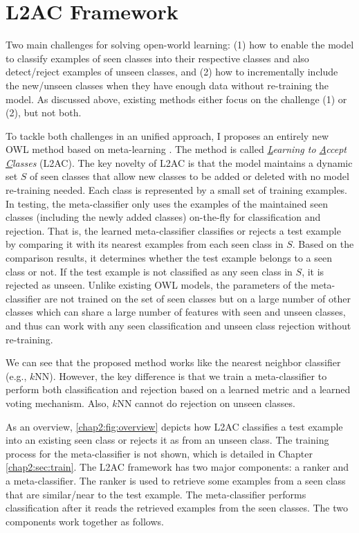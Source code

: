 \section{L2AC Framework}
Two main challenges for solving open-world learning: (1) how to enable the model to classify examples of seen classes into their respective classes and also detect/reject examples of unseen classes, and (2) how to incrementally include the new/unseen classes when they have enough data without re-training the model.
As discussed above, existing methods either focus on the challenge (1) or (2), but not both.

To tackle both challenges in an unified approach, I proposes an entirely new OWL method based on meta-learning \cite{thrun2012learning,andrychowicz2016learning,fernando2017pathnet,finn2017model,finn2018probabilistic}. The method is called \textit{\underline{L}earning to \underline{A}ccept \underline{C}lasses} (L2AC). The key novelty of L2AC is that the model maintains a dynamic set $S$ of seen classes that allow new classes to be added or deleted with no model re-training needed. Each class is represented by a small set of training examples. In testing, the meta-classifier only uses the examples of the maintained seen classes (including the newly added classes) on-the-fly for classification and rejection. That is, the learned meta-classifier classifies or rejects a test example by comparing it with its nearest examples from each seen class in $S$. Based on the comparison results, it determines whether the test example belongs to a seen class or not. If the test example is not classified as any seen class in $S$, it is rejected as unseen. Unlike existing OWL models, 
the parameters of the meta-classifier are not trained on the set of seen classes but on a large number of other classes which can share a large number of features with seen and unseen classes, and thus can work with any seen classification and unseen class rejection without re-training. 

We can see that the proposed method works like the nearest neighbor classifier (e.g., $k$NN). However, the key difference is that we train a meta-classifier to perform both classification and rejection based on a learned metric and a learned voting mechanism. Also, 
$k$NN cannot do rejection on unseen classes. 

As an overview, \ref{chap2:fig:overview} depicts how L2AC classifies a test example into an existing seen class or rejects it as from an unseen class. The training process for the meta-classifier is not shown, which is detailed in Chapter \ref{chap2:sec:train}. 
The L2AC framework has two major components: a ranker and a meta-classifier. 
The ranker is used to retrieve some examples from a seen class that are similar/near to the test example. The meta-classifier performs classification after it reads the retrieved examples from the seen classes. The two components work together as follows.

